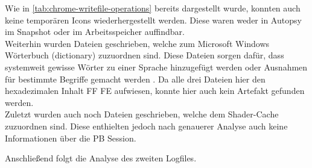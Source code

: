 \begin{appendices}
{\begin{landscape}
\begin{table}[h!]
{\begin{tabular}{cllll}
				\end{tabular}
}
\end{table}
\end{landscape}
}
\restoregeometry
\begin{sloppypar}

Wie in \autoref{tab:chrome-writefile-operations} bereits dargestellt wurde, konnten auch keine temporären Icons wiederhergestellt werden. Diese waren weder in Autopsy im Snapshot oder im Arbeitsspeicher auffindbar. \\
Weiterhin wurden Dateien geschrieben, welche zum Microsoft Windows Wörterbuch (dictionary) zuzuordnen sind. Diese Dateien sorgen dafür, dass systemweit gewisse Wörter zu einer Sprache hinzugefügt werden oder Ausnahmen für bestimmte Begriffe gemacht werden \cite{DictionaryWin10Files}. Da alle drei Dateien hier den hexadezimalen Inhalt \glqq{}FF FE\grqq{} aufwiesen, konnte hier auch kein Artefakt gefunden werden.\\
Zuletzt wurden auch noch Dateien geschrieben, welche dem Shader-Cache zuzuordnen sind. Diese enthielten jedoch nach genauerer Analyse auch keine Informationen über die PB Session.\end{sloppypar}

Anschließend folgt die Analyse des zweiten Logfiles.

\end{appendices}

